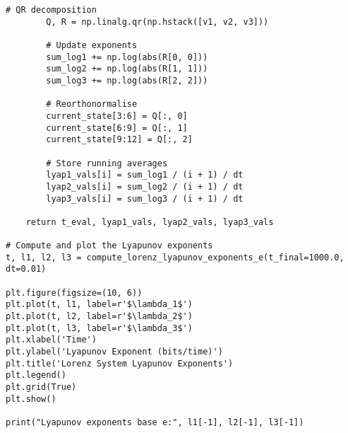 \begin{lstlisting}[style=python]
        # QR decomposition
        Q, R = np.linalg.qr(np.hstack([v1, v2, v3]))
        
        # Update exponents
        sum_log1 += np.log(abs(R[0, 0]))
        sum_log2 += np.log(abs(R[1, 1]))
        sum_log3 += np.log(abs(R[2, 2]))
        
        # Reorthonormalise
        current_state[3:6] = Q[:, 0]
        current_state[6:9] = Q[:, 1]
        current_state[9:12] = Q[:, 2]
        
        # Store running averages
        lyap1_vals[i] = sum_log1 / (i + 1) / dt
        lyap2_vals[i] = sum_log2 / (i + 1) / dt
        lyap3_vals[i] = sum_log3 / (i + 1) / dt
    
    return t_eval, lyap1_vals, lyap2_vals, lyap3_vals

# Compute and plot the Lyapunov exponents
t, l1, l2, l3 = compute_lorenz_lyapunov_exponents_e(t_final=1000.0, dt=0.01)

plt.figure(figsize=(10, 6))
plt.plot(t, l1, label=r'$\lambda_1$')
plt.plot(t, l2, label=r'$\lambda_2$')
plt.plot(t, l3, label=r'$\lambda_3$')
plt.xlabel('Time')
plt.ylabel('Lyapunov Exponent (bits/time)')
plt.title('Lorenz System Lyapunov Exponents')
plt.legend()
plt.grid(True)
plt.show()

print("Lyapunov exponents base e:", l1[-1], l2[-1], l3[-1])
\end{lstlisting}
